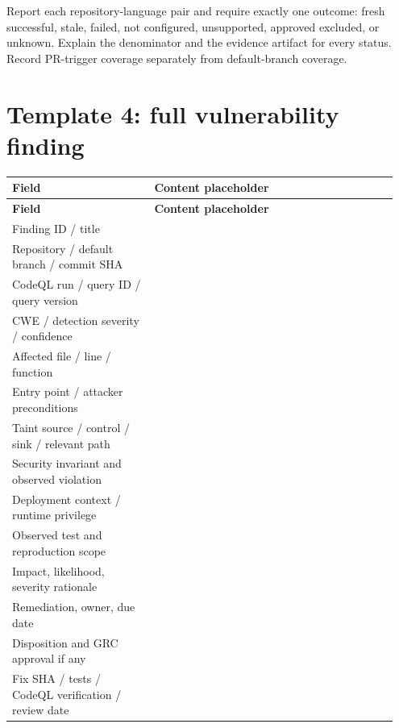 \documentclass[11pt,letterpaper,oneside]{book}
\begin{document}
Report each repository-language pair and require exactly one outcome: fresh successful, stale, failed, not configured, unsupported, approved excluded, or unknown. Explain the denominator and the evidence artifact for every status. Record PR-trigger coverage separately from default-branch coverage.

\section{Template 4: full vulnerability finding}

\small
\setlength{\tabcolsep}{2pt}
\renewcommand{\arraystretch}{1.18}
\begin{longtable}{>{\raggedright\arraybackslash}p{0.35\linewidth}>{\raggedright\arraybackslash}p{0.6\linewidth}}
\toprule
\textbf{Field} & \textbf{Content placeholder}\\
\midrule
\endfirsthead
\toprule
\textbf{Field} & \textbf{Content placeholder}\\
\midrule
\endhead
Finding ID / title & \rule{0pt}{13pt}\underline{\hspace{8cm}}\\
Repository / default branch / commit SHA & \rule{0pt}{13pt}\underline{\hspace{8cm}}\\
CodeQL run / query ID / query version & \rule{0pt}{13pt}\underline{\hspace{8cm}}\\
CWE / detection severity / confidence & \rule{0pt}{13pt}\underline{\hspace{8cm}}\\
Affected file / line / function & \rule{0pt}{13pt}\underline{\hspace{8cm}}\\
Entry point / attacker preconditions & \rule{0pt}{13pt}\underline{\hspace{8cm}}\\
Taint source / control / sink / relevant path & \rule{0pt}{13pt}\underline{\hspace{8cm}}\\
Security invariant and observed violation & \rule{0pt}{13pt}\underline{\hspace{8cm}}\\
Deployment context / runtime privilege & \rule{0pt}{13pt}\underline{\hspace{8cm}}\\
Observed test and reproduction scope & \rule{0pt}{13pt}\underline{\hspace{8cm}}\\
Impact, likelihood, severity rationale & \rule{0pt}{13pt}\underline{\hspace{8cm}}\\
Remediation, owner, due date & \rule{0pt}{13pt}\underline{\hspace{8cm}}\\
Disposition and GRC approval if any & \rule{0pt}{13pt}\underline{\hspace{8cm}}\\
Fix SHA / tests / CodeQL verification / review date & \rule{0pt}{13pt}\underline{\hspace{8cm}}\\
\bottomrule
\end{longtable}
\end{document}
